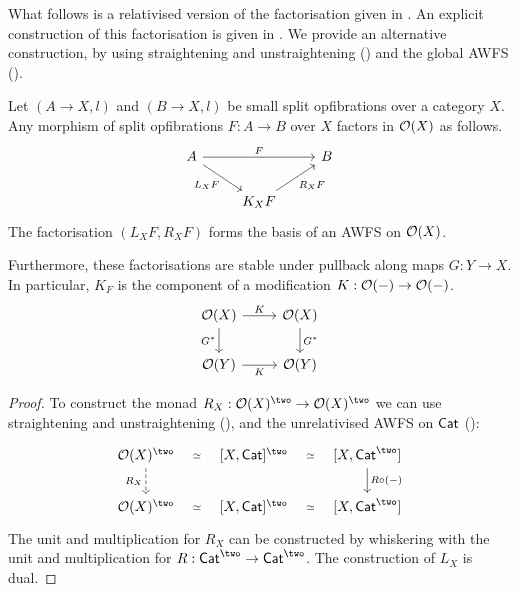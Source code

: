 What follows is a relativised version of the factorisation given in
.
An explicit construction of this factorisation
is given in \cite[Lemma 4.33.14]{stacks-project}.
We provide an alternative construction,
by using straightening and unstraightening ()
and the global AWFS ().
\begin{theorem}\label{thm:relativised-AWFS}
  Let $(A \to X,l)$ and $(B \to X,l)$
  be small split opfibrations over a category $X$.
  Any morphism of split opfibrations $F : A \to B$ over $X$
  factors in ${\mathcal{O}}(X)$ as follows.
  \[ \begin{tikzcd}
    A && B \\
    & {K_X F}
    \arrow["F", from=1-1, to=1-3]
    \arrow["{L_X F}"', from=1-1, to=2-2]
    \arrow["{R_X F}"', from=2-2, to=1-3]
  \end{tikzcd} \]
  The factorisation $(L_X F, R_X F)$
  forms the basis of an AWFS on ${\mathcal{O}}(X)$.

  Furthermore, these factorisations are stable under pullback
  along maps $G : Y \to X$.
  In particular, $K_F$ is the component of a modification
  $K : {\mathcal{O}}(-) \to {\mathcal{O}}(-)$.
  \[
  \begin{tikzcd}
    {\opfibcart(X)} & {\opfibcart(X)} \\
    {\opfibcart(Y)} & {\opfibcart(Y)}
    \arrow["K", from=1-1, to=1-2]
    \arrow["{G^*}"', from=1-1, to=2-1]
    \arrow["{G^*}", from=1-2, to=2-2]
    \arrow["K"', from=2-1, to=2-2]
  \end{tikzcd}
  \]
\end{theorem}
\begin{proof}
  To construct the monad
  $R_X : \opfibcart(X)^\two \to \opfibcart(X)^\two$
  we can use straightening and unstraightening
  (),
  and the unrelativised AWFS on $\mathsf{Cat}$
  ():
  \[ \begin{tikzcd}
    {\opfibcart(X)^\two} & {[X,\Cat]^\two} & {[X,\Cat^\two]} \\
    {\opfibcart(X)^\two} & {[X,\Cat]^\two} & {[X,\Cat^\two]}
    \arrow["\simeq"{description}, draw=none, from=1-1, to=1-2]
    \arrow["{R_X}"', dashed, from=1-1, to=2-1]
    \arrow["\simeq"{description}, draw=none, from=1-2, to=1-3]
    \arrow["{R \circ (-)}", from=1-3, to=2-3]
    \arrow["\simeq"{description}, draw=none, from=2-2, to=2-1]
    \arrow["\simeq"{description}, draw=none, from=2-3, to=2-2]
  \end{tikzcd} \]
  The unit and multiplication for $R_X$
  can be constructed by whiskering
  with the unit and multiplication for $R : \Cat^\two \to \Cat^\two$.
  The construction of $L_X$ is dual.
\end{proof}

